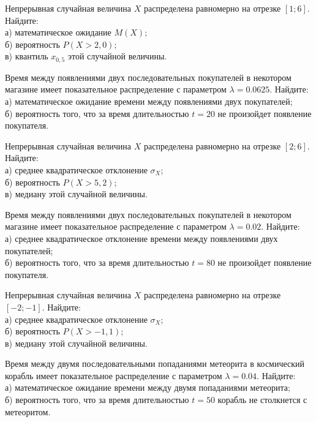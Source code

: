 \z Непрерывная случайная величина $X$ распределена равномерно на отрезке $[1; 6]$. Найдите: \\ \quad а) математическое ожидание $M(X)$; \\ \quad б) вероятность $P(X>2{,}0)$; \\ \quad в) квантиль $x_{0{,}5}$ этой случайной величины.


\vfill

\z Время между появлениями двух последовательных покупателей в некотором магазине имеет показательное распределение с параметром $\lambda = 0.0625$. Найдите: \\ \quad а) математическое ожидание времени между появлениями двух покупателей; \\ \quad б) вероятность того, что за время длительностью $t = 20$ не произойдет появление покупателя.
 

\vfill

\newpage\setcounter{zad}{0}

\z Непрерывная случайная величина $X$ распределена равномерно на отрезке $[2; 6]$. Найдите: \\ \quad а) среднее квадратическое отклонение $\sigma_X$; \\ \quad б) вероятность $P(X>5{,}2)$; \\ \quad в) медиану этой случайной величины.


\vfill

\z Время между появлениями двух последовательных покупателей в некотором магазине имеет показательное распределение с параметром $\lambda = 0.02$. Найдите: \\ \quad а) среднее квадратическое отклонение времени между появлениями двух покупателей; \\ \quad б) вероятность того, что за время длительностью $t = 80$ не произойдет появление покупателя.
 

\vfill

\newpage\setcounter{zad}{0}

\z Непрерывная случайная величина $X$ распределена равномерно на отрезке $[-2; -1]$. Найдите: \\ \quad а) среднее квадратическое отклонение $\sigma_X$; \\ \quad б) вероятность $P(X>-1{,}1)$; \\ \quad в) медиану этой случайной величины.


\vfill

\z Время между двумя последовательными попаданиями метеорита в космический корабль имеет показательное распределение с параметром $\lambda = 0.04$. Найдите: \\ \quad а) математическое ожидание времени между двумя попаданиями метеорита; \\ \quad б) вероятность того, что за время длительностью $t = 50$ корабль не столкнется с метеоритом.
 

